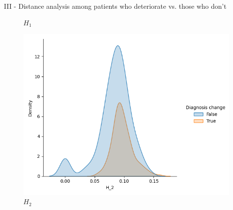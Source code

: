 \documentclass[aspectratio=169, 10pt, dvipsnames]{beamer}
\begin{document}
\begin{frame}[fragile]{III - Distance analysis among patients who deteriorate vs. those who don't}
\begin{figure}
    \caption{$H_1$}
  \end{figure}
  \endminipage
  \hfill
  \begin{figure}
    \centering
     \includegraphics[width=\textwidth]{figures/temporal_evolution/bottleneck_H_2_dist_diag_change.png}
    \caption{$H_2$}
  \end{figure}
  \endminipage
\end{frame}
\end{document}
